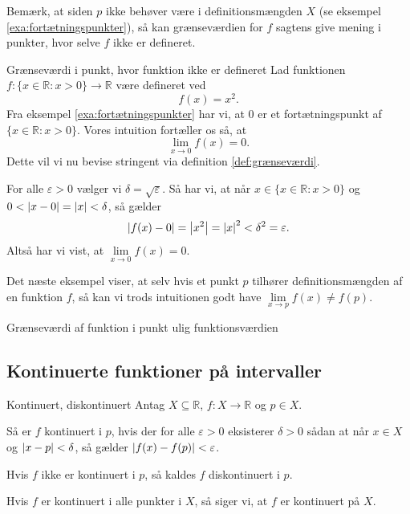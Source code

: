Bemærk, at siden $p$ ikke behøver være i definitionsmængden $X$ (se eksempel \ref{exa:fortætningspunkter}), så kan grænseværdien for $f$ sagtens give mening i punkter, hvor selve $f$ ikke er defineret.

\begin{example}[label=exa:grænseværdi]{Grænseværdi i punkt, hvor funktion ikke er defineret}{}
 Lad funktionen $f:\{ x \in \mathbb{R}:x>0 \} \to \mathbb{R}$ være defineret ved
  \[
  f(x)= x^2.
  \] 
  Fra eksempel \ref{exa:fortætningspunkter} har vi, at $0$ er et fortætningspunkt af $\{ x \in \mathbb{R}:x>0 \} $. 
  Vores intuition fortæller os så, at
  \[
  \lim_{x \to 0} f(x)= 0.
  \] 
  Dette vil vi nu bevise stringent via definition \ref{def:grænseværdi}.

  For alle $\varepsilon >0$ vælger vi $\delta =\sqrt{\varepsilon } $. 
  Så har vi, at når $x \in \{ x \in \mathbb{R}:x>0 \} $ og $0<\abs{x-0} =\abs{x} <\delta $, så gælder
  \[
    \abs{f(x)-0} =\abs{x^2}=\abs{x}^2<\delta ^2=\varepsilon.
  \] 
  Altså har vi vist, at $\lim\limits_{x \to 0}f(x)=0$.
\end{example}

Det næste eksempel viser, at selv hvis et punkt $p$ tilhører definitionsmængden af en funktion $f$, så kan vi trods intuitionen godt have $\lim\limits_{x \to p} f(x) \neq f(p)$.

\begin{example}[label=exa:grænseværdi2]{Grænseværdi af funktion i punkt ulig funktionsværdien}{}
  
\end{example}

\subsection{Kontinuerte funktioner på intervaller}%
\label{sub:Kontinuert}


\begin{definition}[label=def:kontinuert]{Kontinuert, diskontinuert}{}
 Antag $X \subseteq \mathbb{R}$, $f:X \to \mathbb{R}$ og $p \in X$.

  Så er $f$ kontinuert i $p$, hvis der for alle $\varepsilon >0$ eksisterer $\delta >0$ sådan at når $x \in X$ og $\abs{x-p} < \delta  $, så gælder $\abs{f(x)-f(p)}<\varepsilon $. 

  Hvis $f$ ikke er kontinuert i $p$, så kaldes $f$ diskontinuert i $p$. 

  Hvis $f$ er kontinuert i alle punkter i $X$, så siger vi, at $f$ er kontinuert på $X$. 
\end{definition}

